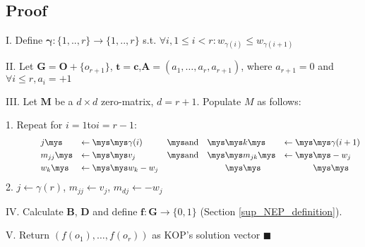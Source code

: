 

		\subsection{Proof}\label{sup_proof}


				\vspace{5pt}
				\small{\noindent I. Define $\boldsymbol{\gamma}:\{1,..,r\}\rightarrow \{1,..,r\}$ \mys s.t. $\forall i, 1\leq i <r: w_{\gamma(i)} \leq w_{\gamma(i+1)}$

							\noindent II. Let $\boldsymbol{G}=\boldsymbol{O}+\{o_{r+1}\}$, \mys $\boldsymbol{t}=\boldsymbol{c}$,\mys $\boldsymbol{A}=(a_1,\dots,a_r, a_{r+1})$, \mys where \mys $a_{r+1}=0$ \mys and \mys $\forall i\leq r,$\mys$a_i=+1$

							\noindent III. Let $\boldsymbol  {M}$ \mys be a $d\times d$ zero-matrix, $d=r+1$. Populate $M$ as follows:

								\noindent\hspace{20pt}1. Repeat for \mys$i=1$\quad to\quad $i=r-1$:
							\setlength{\belowdisplayskip}{0pt} %
							\begin{alignat*}{7}
										\qquad\qquad & j\mys       & \leftarrow\mys\mys   & \gamma(i)   & \mys\text{and} \quad\mys\mys & k\mys       & \leftarrow\mys\mys   & \gamma(i+1) \\
										\qquad\qquad & m_{jj}\mys  & \leftarrow\mys\mys   & v_j         & \mys\text{and} \quad\mys\mys & m_{jk}\mys  & \leftarrow\mys\mys   & -w_j \\
										\qquad\qquad & w_{k}\mys   & \leftarrow\mys\mys   & w_{k} - w_j & \mys                         &\mys         & \mys                 & \mys
							\end{alignat*}
							\noindent\hspace{20pt}2. $j\leftarrow\gamma(r)$, $m_{jj}\leftarrow v_j$, $m_{dj}\leftarrow -w_j$

							\noindent IV. Calculate $\boldsymbol{B}$, $\boldsymbol{D}$ and define $\boldsymbol{f}:\boldsymbol{G}  \rightarrow \{0,1\}$ (Section \ref{sup_NEP_definition}).

							\noindent V. Return $(f(o_1), \dots, f(o_r))$ as KOP's solution vector \hspace{5pt}$\blacksquare$
						}

